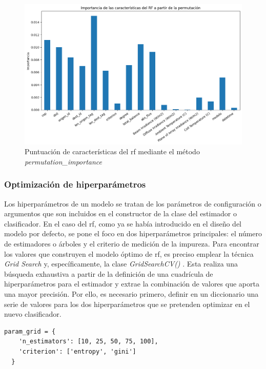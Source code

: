 \newpage

\begin{figure}[H]
  \centering
  \includegraphics[width=1\textwidth]{img/desarrollo/rf/importance2.png}
  \caption{Puntuación de características del \acrshort{rf} mediante el método \textit{permutation\_importance}}
  \label{fig:imp2}
\end{figure}

\subsubsection{Optimización de hiperparámetros}
\label{rf2}

Los hiperparámetros de un modelo se tratan de los parámetros de configuración o argumentos que son incluidos en el constructor de la clase del estimador o clasificador. En el caso del \gls{rf}, como ya se había introducido en el diseño del modelo por defecto, se pone el foco en dos hiperparámetros principales: el número de estimadores o árboles y el criterio de medición de la impureza. Para encontrar los valores que construyen el modelo óptimo de \gls{rf}, es preciso emplear la técnica \textit{Grid Search} \cite{gridsearch} y, específicamente, la clase \textit{GridSearchCV()} \cite{gridsearch2}. Esta realiza una búsqueda exhaustiva a partir de la definición de una cuadrícula de hiperparámetros para el estimador y extrae la combinación de valores que aporta una mayor precisión. Por ello, es necesario primero, definir en un diccionario una serie de valores para los dos hiperparámetros que se pretenden optimizar en el nuevo clasificador.

\begin{lstlisting}[style=Python, caption={Cuadrícula de parámetros RF}]
  param_grid = {
    'n_estimators': [10, 25, 50, 75, 100],
    'criterion': ['entropy', 'gini']
  }
\end{lstlisting}

